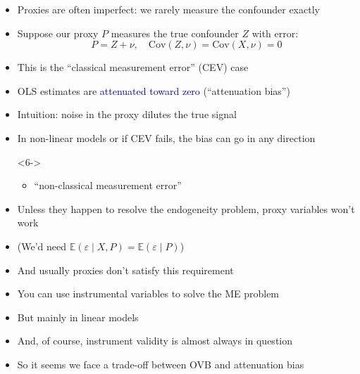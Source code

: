\documentclass[aspectratio=169]{beamer}
\begin{document}
\begin{frame}

\begin{itemize}
\itemsep1.5em
\item<1-> Proxies are often imperfect: we rarely measure the confounder exactly
\item<2-> Suppose our proxy $P$ measures the true confounder $Z$ with error:
\[
P = Z + \nu, \quad \text{Cov}(Z,\nu)=\text{Cov}(X,\nu)=0
\]
\item<3-> This is the ``classical measurement error'' (CEV) case
\item<4-> OLS estimates are \textcolor{navy}{attenuated toward zero} (``attenuation bias'')
\item<5-> Intuition: noise in the proxy dilutes the true signal
\item<6-> In non-linear models or if CEV fails, the bias can go in any direction
\item[]<6->
\begin{itemize}
    \item<7-> ``non-classical measurement error''
\end{itemize}
\end{itemize}

\end{frame}




\begin{frame}
\begin{itemize}
\itemsep1.5em
\item<1-> Unless they happen to resolve the endogeneity problem, proxy variables won't work
\item<2-> (We'd need $\mathbb{E}\left(\varepsilon \mid X, P\right) = \mathbb{E}\left(\varepsilon \mid P\right)$)
\item<3-> And usually proxies don't satisfy this requirement
\item<4-> You can use instrumental variables to solve the ME problem
\item<5-> But mainly in linear models
\item<6-> And, of course, instrument validity is almost always in question
\item<7-> So it seems we face a trade-off between OVB and attenuation bias
\end{itemize}
\end{frame}
\end{document}
